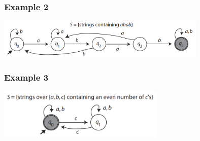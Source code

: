 \documentclass{article}[18pt]
\begin{document}
\subsubsection{Example 2}
\begin{center}
\includegraphics[width=10cm]{FSM3.png}
\end{center}
\subsubsection{Example 3}
\begin{center}
\includegraphics[width=8cm]{FSM4.png}
\end{center}
\end{document}
